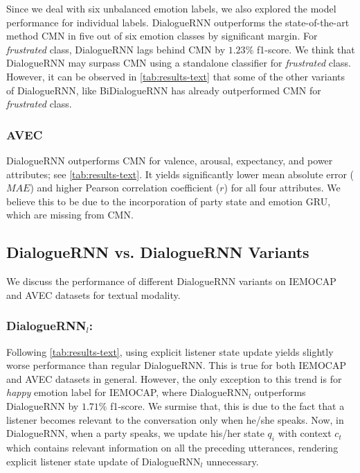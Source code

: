\documentclass[letterpaper]{article} %
\begin{document}
Since we deal with six unbalanced emotion labels, we also explored the
model performance for individual labels. DialogueRNN outperforms the state-of-the-art method
CMN in five out of six emotion classes by significant margin. For \emph{frustrated} class,
DialogueRNN lags behind CMN by $1.23\%$ f1-score. We think that DialogueRNN may surpass CMN
using a standalone classifier for \emph{frustrated} class. However, it can be observed in 
\cref{tab:results-text} that some of the other variants of DialogueRNN, like BiDialogueRNN has already outperformed CMN for \emph{frustrated} class.


\subsubsection{AVEC}

DialogueRNN outperforms CMN for valence, arousal, expectancy, and
power attributes; see \cref{tab:results-text}. It yields significantly lower mean absolute error ($MAE$)
and higher Pearson correlation coefficient ($r$) for all four attributes. We believe this to be due to
the incorporation of party state and emotion GRU, which are missing from CMN.



\subsection{DialogueRNN vs. DialogueRNN Variants}

We discuss the performance of different DialogueRNN variants on IEMOCAP and AVEC datasets for textual modality.

\subsubsection{DialogueRNN$_l$:}

Following \cref{tab:results-text}, using explicit listener state update yields slightly worse
performance than regular DialogueRNN. This is true for both IEMOCAP and AVEC datasets in general.
However, the only exception to this trend is for \emph{happy} emotion label for IEMOCAP, where
DialogueRNN$_l$ outperforms DialogueRNN by $1.71\%$ f1-score. We surmise that, this is due to
the fact that a listener becomes relevant to the conversation only when he/she
speaks. Now, in DialogueRNN, when a party speaks, we update his/her state $q_i$ with context
$c_t$ which contains relevant information on all the preceding utterances, rendering
explicit listener state update of DialogueRNN$_l$ unnecessary.
\end{document}
